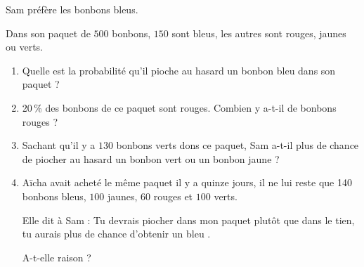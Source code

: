 
\medskip

Sam préfère les bonbons bleus.

Dans son paquet de $500$ bonbons, $150$ sont bleus, les  autres sont rouges, jaunes ou verts.

\medskip

\begin{enumerate}
\item Quelle est la probabilité qu'il pioche au hasard un bonbon bleu dans son paquet ?
\item 20\,\% des bonbons de ce paquet sont rouges. Combien y a-t-il de bonbons rouges ?
\item Sachant qu'il y a $130$ bonbons verts dons ce paquet, Sam a-t-il plus de chance de piocher au hasard un bonbon vert ou un bonbon jaune ?
\item  Aïcha avait acheté le même paquet il y a quinze jours, il ne lui reste que 140 bonbons bleus, $100$ jaunes, $60$ rouges et $100$ verts.

Elle dit à Sam : \og Tu devrais piocher dans mon paquet
plutôt que dans le tien, tu aurais plus de chance d'obtenir un bleu \fg.

A-t-elle raison ?
\end{enumerate}

\bigskip

